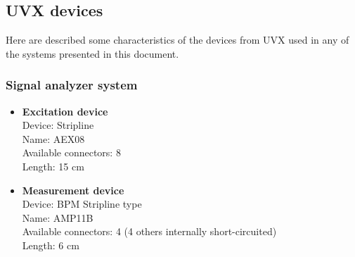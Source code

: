 \subsection{UVX devices}
Here are described some characteristics of the devices from UVX used in any of the systems presented in this document.

\subsubsection{Signal analyzer system}

\begin{itemize}
	\item \textbf{Excitation device}\\
		Device: Stripline\\
		Name: AEX08\\
		Available connectors: 8\\
		Length: 15 cm
	\item \textbf{Measurement device}\\
		Device: BPM Stripline type\\
		Name: AMP11B\\
		Available connectors: 4 (4 others internally short-circuited)\\
		Length: 6 cm
\end{itemize}